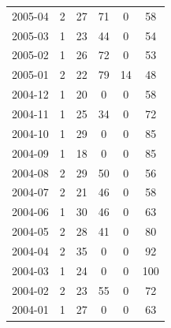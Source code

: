 \documentclass[12pt]{report}
\begin{document}
\begin{longtable}{|c|c|c|c|c|c|}
            2005-04 & 2 & 27 & 71 & 0 & 58 \\
            2005-03 & 1 & 23 & 44 & 0 & 54 \\
            2005-02 & 1 & 26 & 72 & 0 & 53 \\
            2005-01 & 2 & 22 & 79 & 14 & 48 \\
            2004-12 & 1 & 20 & 0 & 0 & 58 \\
            2004-11 & 1 & 25 & 34 & 0 & 72 \\
            2004-10 & 1 & 29 & 0 & 0 & 85 \\
            2004-09 & 1 & 18 & 0 & 0 & 85 \\
            2004-08 & 2 & 29 & 50 & 0 & 56 \\
            2004-07 & 2 & 21 & 46 & 0 & 58 \\
            2004-06 & 1 & 30 & 46 & 0 & 63 \\
            2004-05 & 2 & 28 & 41 & 0 & 80 \\
            2004-04 & 2 & 35 & 0 & 0 & 92 \\
            2004-03 & 1 & 24 & 0 & 0 & 100 \\
            2004-02 & 2 & 23 & 55 & 0 & 72 \\
            2004-01 & 1 & 27 & 0 & 0 & 63 \\

        \end{longtable}

        \caption{Google Trend Data Feb -2025 Source: See Bibliography}
        \label{tab:}
\end{document}
